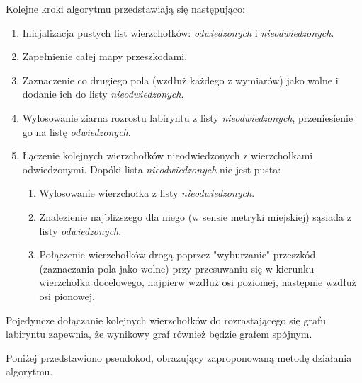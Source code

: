 Kolejne kroki algorytmu przedstawiają się następująco:
\begin{enumerate}
	\item Inicjalizacja pustych list wierzchołków: {\it odwiedzonych} i {\it nieodwiedzonych}.
	\item Zapełnienie całej mapy przeszkodami.
	\item Zaznaczenie co drugiego pola (wzdłuż każdego z wymiarów) jako wolne i dodanie ich do listy {\it nieodwiedzonych}.
	\item Wylosowanie ziarna rozrostu labiryntu z listy {\it nieodwiedzonych}, przeniesienie go na listę {\it odwiedzonych}.
	\item Łączenie kolejnych wierzchołków nieodwiedzonych z wierzchołkami odwiedzonymi. Dopóki lista {\it nieodwiedzonych} nie jest pusta:
	\begin{enumerate}
		\item Wylosowanie wierzchołka z listy {\it nieodwiedzonych}.
		\item Znalezienie najbliższego dla niego (w sensie metryki miejskiej) sąsiada z listy {\it odwiedzonych}.
		\item Połączenie wierzchołków drogą poprzez "wyburzanie" przeszkód (zaznaczania pola jako wolne) przy przesuwaniu się w kierunku wierzchołka docelowego, najpierw wzdłuż osi poziomej, następnie wzdłuż osi pionowej.
	\end{enumerate}
\end{enumerate}

Pojedyncze dołączanie kolejnych wierzchołków do rozrastającego się grafu labiryntu zapewnia, że wynikowy graf również będzie grafem spójnym.

Poniżej przedstawiono pseudokod, obrazujący zaproponowaną metodę działania algorytmu.

